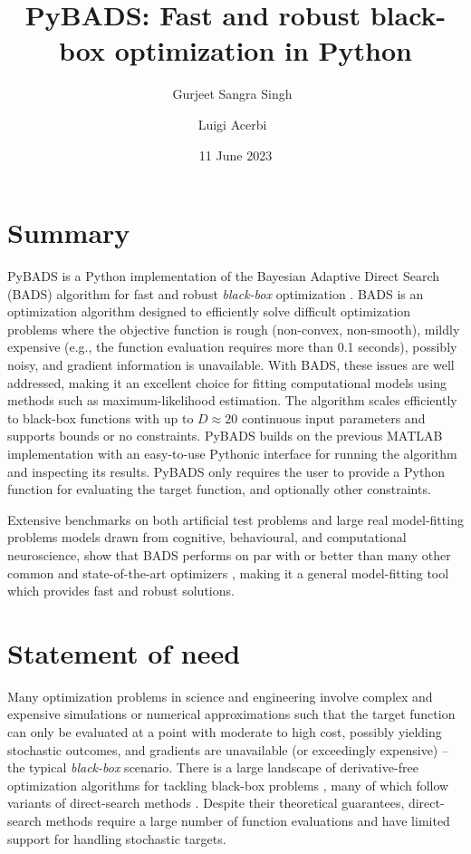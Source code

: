 \documentclass[
]{article}
\title{PyBADS: Fast and robust black-box optimization in Python}
\author[1, 3%
  ]{Gurjeet Sangra Singh%
    \,%
    }
\author[2%
  ]{Luigi Acerbi%
    \,%
    }
\affil[1]{University of Geneva}
\affil[2]{University of Helsinki}
\affil[3]{University of Applied Sciences and Art Western Switzerland (HES-SO)}
\date{11 June 2023}
\begin{document}
\maketitle

\hypertarget{summary}{%
\section{Summary}\label{summary}}
PyBADS is a Python implementation of the Bayesian Adaptive Direct Search (BADS) algorithm for fast and robust \textit{black-box} optimization \parencite{acerbi2017practical}. BADS is an optimization algorithm designed to efficiently solve difficult optimization problems where the objective function is rough (non-convex, non-smooth), mildly expensive (e.g., the function evaluation requires more than 0.1 seconds), possibly noisy, and gradient information is unavailable. With BADS, these issues are well addressed, making it an excellent choice for fitting computational models using methods such as maximum-likelihood estimation.
The algorithm scales efficiently to black-box functions with up to $D \approx 20$ continuous input parameters and supports bounds or no constraints. PyBADS builds on the previous MATLAB implementation with an easy-to-use Pythonic interface for running the algorithm and inspecting its results. PyBADS only requires the user to provide a Python function for evaluating the target function, and optionally other constraints.

Extensive benchmarks on both artificial test problems and large real model-fitting problems models drawn from cognitive, behavioural, and computational neuroscience, show that BADS performs on par with or better than many other common and state-of-the-art optimizers \parencite{acerbi2017practical}, making it a general model-fitting tool which provides fast and robust solutions. 

\hypertarget{statement-of-need}{%
\section{Statement of need}\label{statement-of-need}}

Many optimization problems in science and engineering involve complex and expensive simulations or numerical approximations such that the target function can only be evaluated at a point with moderate to high cost, possibly yielding stochastic outcomes, and gradients are unavailable (or exceedingly expensive) -- the typical \textit{black-box} scenario. There is a large landscape of derivative-free optimization algorithms for tackling black-box problems  \parencite{Rios2013}, many of which follow variants of direct-search methods \parencite{MADS, stoMADS, orthoMADS, deng2006adaptation}.
Despite their theoretical guarantees, direct-search methods require a large number of function evaluations and have limited support for handling stochastic targets. 
\end{document}
